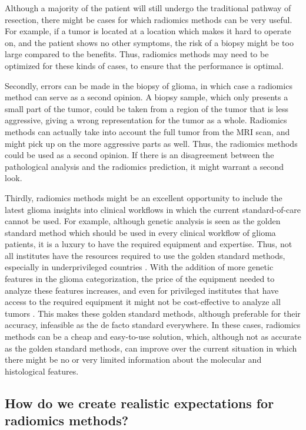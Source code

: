 Although a majority of the patient will still undergo the traditional pathway of resection, there might be cases for which radiomics methods can be very useful.
For example, if a \gls{tumor} is located at a location which makes it hard to operate on, and the patient shows no other symptoms, the risk of a biopsy might be too large compared to the benefits.
Thus, radiomics methods may need to be optimized for these kinds of cases, to ensure that the performance is optimal.

Secondly, errors can be made in the biopsy of glioma, in which case a radiomics method can serve as a second opinion.
A biopsy sample, which only presents a small part of the \gls{tumor}, could be taken from a region of the tumor that is less aggressive, giving a wrong representation for the \gls{tumor} as a whole.
Radiomics methods can actually take into account the full \gls{tumor} from the \gls{MRI} scan, and might pick up on the more aggressive parts as well.
Thus, the radiomics methods could be used as a second opinion.
If there is an disagreement between the pathological analysis and the radiomics prediction, it might warrant a second look.

Thirdly, radiomics methods might be an excellent opportunity to include  the latest glioma insights into clinical workflows in which the current standard-of-care cannot be used.
For example, although genetic analysis is seen as the golden standard method which should be used in every clinical workflow of glioma patients, it is a luxury to have the required equipment and expertise.
Thus, not all institutes have the resources required to use the golden standard methods, especially in underprivileged countries \autocite{santosh2019india}.
With the addition of more genetic features in the glioma categorization, the price of the equipment needed to analyze these features  increases, and even for privileged institutes that have access to the required equipment it might not be cost-effective to analyze all \glspl{tumor} \autocite{malzkorn2016practical,dewitt2017costIDH}.
This makes these golden standard methods, although preferable for their accuracy, infeasible as the de facto standard everywhere.
In these cases, radiomics methods can be a cheap and easy-to-use solution, which, although not as accurate as the golden standard methods, can improve over the current situation in which there might be no or very limited information about the molecular and histological features.


\subsection{How do we create realistic expectations for radiomics methods?}

